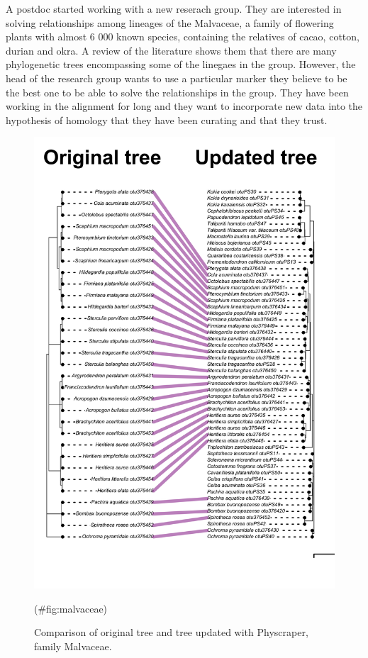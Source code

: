 \documentclass[]{article}
\begin{document}
A postdoc started working with a new reserach group. They are interested in solving relationships among lineages of the Malvaceae, a family of flowering plants with almost 6 000 known species, containing the relatives of cacao, cotton, durian and okra.
A review of the literature shows them that there are many phylogenetic trees encompassing some of the linegaes in the group. However, the head of the research group wants to use a particular marker they believe to be the best one to be able to solve the relationships in the group. They have been working in the alignment for long and they want to incorporate new data into the hypothesis of homology that they have been curating and that they trust.

\begin{figure}

{\centering \includegraphics[width=0.85\linewidth]{docs/figs/cotree-plot2-1} 

}

\caption{Comparison of original tree and tree updated with Physcraper, family Malvaceae.}(\#fig:malvaceae)
\end{figure}
\newpage
\end{document}
